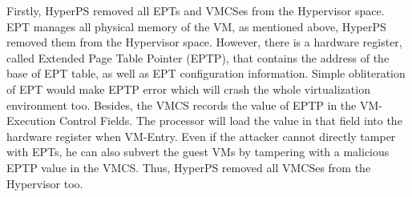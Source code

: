 Firstly, HyperPS removed all EPTs and VMCSes from the Hypervisor space. EPT manages all physical memory of the VM, as mentioned above, HyperPS removed them from the Hypervisor space. However, there is a hardware register, called Extended Page Table Pointer (EPTP), that contains the address of the base of EPT table, as well as EPT configuration information. Simple obliteration of EPT would make EPTP error which will crash the whole virtualization environment too. 
Besides, the VMCS records the value of EPTP in the VM-Execution Control Fields. The processor will load the value in that field into the hardware register when VM-Entry. 
Even if the attacker cannot directly tamper with EPTs, he can also subvert the guest VMs by tampering with a malicious EPTP value in the VMCS. Thus, HyperPS removed all VMCSes from the Hypervisor too. 

